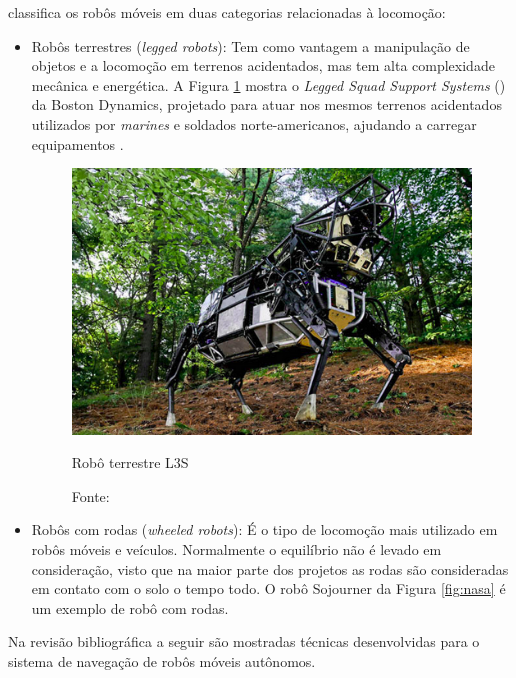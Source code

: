  classifica os robôs móveis em duas categorias relacionadas à locomoção: 
\begin{itemize}
 
 \item Robôs terrestres (\textit{legged robots}): Tem como vantagem a manipulação de objetos e a locomoção em terrenos 
acidentados, mas tem alta complexidade mecânica e energética. A Figura \ref{fig:boston} mostra o 
\textit{Legged Squad Support Systems} () da Boston Dynamics, 
projetado para atuar nos mesmos terrenos acidentados utilizados por \textit{marines} e soldados norte-americanos, 
ajudando a carregar equipamentos \cite{bostondyn}. 
\begin{figure}[h]
 \centering
 \captionsetup{width=0.44\textwidth,font=footnotesize,textfont=bf}
 \includegraphics[scale=0.4]{figuras/bostondyn.png}
 \caption{Robô terrestre  L3S\label{fig:boston}}
 \vspace{-0.3cm}
 \caption*{Fonte: \cite{bostondyn}}
\end{figure}


\item Robôs com rodas (\textit{wheeled robots}): É o tipo de locomoção mais utilizado em robôs móveis e veículos. Normalmente o 
equilíbrio não é levado em consideração, visto que na maior parte dos projetos as rodas são consideradas em contato com o solo 
o tempo todo. O robô Sojourner da Figura \ref{fig:nasa} é um exemplo de robô com rodas.%
\end{itemize}

Na revisão bibliográfica a seguir são mostradas técnicas desenvolvidas para o sistema de navegação de robôs móveis autônomos.

